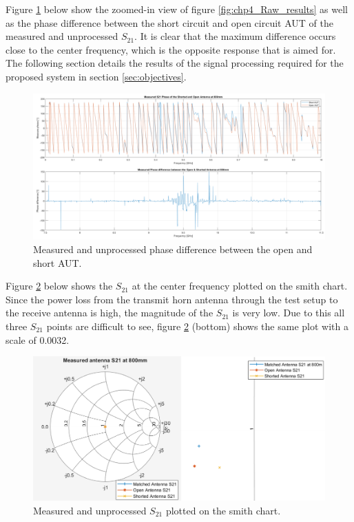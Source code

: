 Figure \ref{fig:chp4_Raw_difference_results} below show the zoomed-in view of figure \ref{fig:chp4_Raw_results} as well as the phase difference between the short circuit and open circuit AUT of the measured and unprocessed \(S_{21}\). It is clear that the maximum difference occurs close to the center frequency, which is the opposite response that is aimed for. The following section details the results of the signal processing required for the proposed system in section \ref{sec:objectives}.

    \begin{figure}[H]
    \centering
    \includegraphics[width=0.99\linewidth]{Figures/chp4_Raw_difference_results.png}
    \caption{Measured and unprocessed phase difference between the open and short AUT.}
    \label{fig:chp4_Raw_difference_results}
    \end{figure}

Figure \ref{fig:chp4_Raw_smith} below shows the \(S_{21}\) at the center frequency plotted on the smith chart. Since the power loss from the transmit horn antenna through the test setup to the receive antenna is high, the magnitude of the \(S_{21}\) is very low. Due to this all three \(S_{21}\) points are difficult to see, figure \ref{fig:chp4_Raw_smith} (bottom) shows the same plot with a scale of 0.0032.

    \begin{figure}[H]
    \centering
    \includegraphics[width=0.9\linewidth]{Figures/chp4_Raw_smith.png}
    \caption{Measured and unprocessed \(S_{21}\) plotted on the smith chart.}
    \label{fig:chp4_Raw_smith}
    \end{figure}

